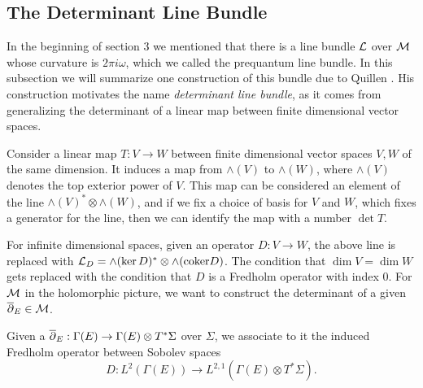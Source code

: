 		
	\subsection{The Determinant Line Bundle}
	In the beginning of section 3 we mentioned that there is a line bundle $\mathcal{L}$ over $\mathcal{M}$ whose curvature is $2\pi i \omega$, which we called the prequantum line bundle. In this subsection we will summarize one construction of this bundle due to Quillen \cite{quillen_determinants_1985}. His construction motivates the name \textit{determinant line bundle}, as it comes from generalizing the determinant of a linear map between finite dimensional vector spaces.
	
	Consider a linear map $T:V\to W$ between finite dimensional vector spaces $V,W$ of the same dimension. It induces a map from $\wedge(V)$ to $\wedge(W)$, where $\wedge(V)$ denotes the top exterior power of $V$. This map can be considered an element of the line $\wedge(V)^\ast \otimes\wedge(W)$, and if we fix a choice of basis for $V$ and $W$, which fixes a generator for the line, then we can identify the map with a number $\det T$. 
	
	For infinite dimensional spaces, given an operator $D:V\to W$, the above line is replaced with $\mathcal{L}_D = \wedge(\ker D)^\ast \otimes \wedge(\text{coker} D)$. The condition that $\dim V = \dim W$ gets replaced with the condition that $D$ is a Fredholm operator with index $0$. For $\mathcal{M}$ in the holomorphic picture, we want to construct the determinant of a given $\overline{\partial}_E \in \mathcal{M}$. 
	
	Given a $\overline{\partial}_E:\Gamma(E)\to \Gamma(E)\otimes T^\ast \Sigma$ over $\Sigma$, we associate to it the induced Fredholm operator between Sobolev spaces 
	\begin{equation}
		D:L^{2}(\Gamma(E)) \to L^{2,1}\left(\Gamma(E)\otimes T^\ast \Sigma\right).
 	\end{equation}
